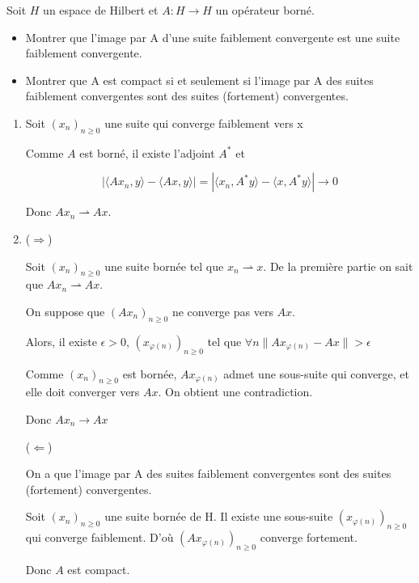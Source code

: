 \documentclass[10pt,a4paper,oneside]{article}
\newenvironment{exercice}[1][Exercice]{\begin{trivlist}
\item[\hskip \labelsep {\bfseries #1}]}{\end{trivlist}}
\newenvironment{solution}[1][Solution]{\begin{trivlist}
\item[\hskip \labelsep {\bfseries #1}]}{\end{trivlist}}
\begin{document}

\begin{exercice}

Soit $H$ un espace de Hilbert et $A: H \rightarrow H$ un opérateur borné.

\begin{itemize}

\item
Montrer que l'image par A d'une suite faiblement convergente est une suite faiblement convergente.

\item
Montrer que A est compact si et seulement si l'image par A des suites faiblement convergentes sont des suites (fortement) convergentes.

\end{itemize}

\end{exercice}


\begin{solution}

\begin{enumerate}

\item
Soit $(x_n)_{n\geq0}$ une suite qui converge faiblement vers x

Comme $A$ est borné, il existe l'adjoint $A^*$ et

\[
|\langle Ax_n,y \rangle - \langle Ax,y \rangle| = |\langle x_n,A^*y \rangle - \langle x,A^*y \rangle| \rightarrow 0
\]

Donc $Ax_n \rightharpoonup Ax$.

\item
($\Rightarrow$)

Soit $(x_n)_{n\geq0}$ une suite bornée tel que $x_n \rightharpoonup x$. De la première partie on sait que $Ax_n \rightharpoonup Ax$.

On suppose que $(Ax_n)_{n\geq0}$ ne converge pas vers $Ax$.

Alors, il existe $\epsilon > 0$, $(x_{\varphi(n)})_{n\geq0}$ tel que $\forall n \| Ax_{\varphi(n)} - Ax \| > \epsilon$

Comme $(x_n)_{n\geq0}$ est bornée, $Ax_{\varphi(n)}$ admet une sous-suite qui converge, et elle doit converger vers $Ax$. On obtient une contradiction.

Donc $Ax_n \rightarrow Ax$

($\Leftarrow$)

On a que l'image par A des suites faiblement convergentes sont des suites (fortement) convergentes.

Soit $(x_n)_{n\geq0}$ une suite bornée de H.
Il existe une sous-suite $(x_{\varphi(n)})_{n\geq0}$ qui converge faiblement.
D'où $(Ax_{\varphi(n)})_{n\geq0}$ converge fortement.

Donc $A$ est compact.

\end{enumerate}

\end{solution}
\end{document}

